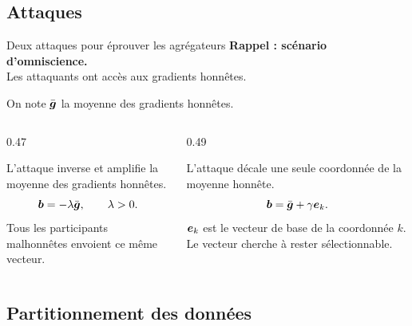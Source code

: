 \subsection{Attaques}

\begin{frame}{Deux attaques pour éprouver les agrégateurs}
    \alert{\textbf{Rappel : scénario d'omniscience.}}\\
    Les attaquants ont accès aux gradients honnêtes.

    \medskip
    On note $\bar{\boldsymbol{g}}$ la moyenne des gradients honnêtes.
    \begin{columns}[T,onlytextwidth]
        \begin{column}{0.47\textwidth}
            \begin{block}{\signflip{}}
                L'attaque inverse et amplifie la moyenne des gradients honnêtes.
                \[
                    \boldsymbol{b}=-\lambda\bar{\boldsymbol{g}},\qquad\lambda>0.
                \]
                Tous les participants malhonnêtes envoient ce même vecteur.
            \end{block}
        \end{column}
        \begin{column}{0.49\textwidth}
            \begin{block}{\smallperturbation{}}
                L'attaque décale une seule coordonnée de la moyenne honnête.
                \[
                    \boldsymbol{b}=\bar{\boldsymbol{g}}+\gamma\boldsymbol{e}_k.
                \]
                $\boldsymbol{e}_k$ est le vecteur de base de la coordonnée $k$.
                Le vecteur cherche à rester sélectionnable.
            \end{block}
        \end{column}
    \end{columns}
\end{frame}

\subsection{Partitionnement des données}


